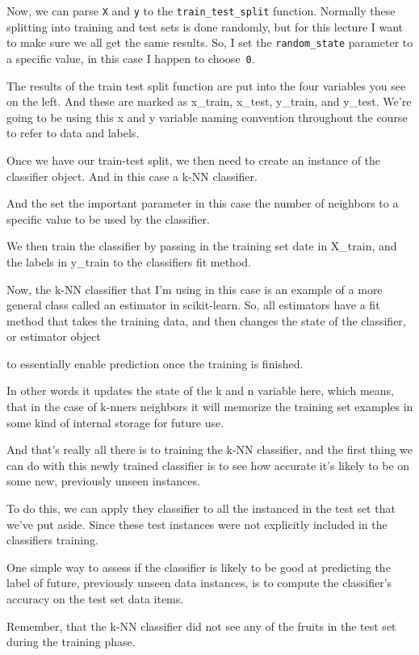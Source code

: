\begin{multicols}{2}
Now, we can parse \texttt{X} and \texttt{y} to the \texttt{train_test_split} function. Normally these splitting into training and test sets is done randomly, but for this lecture I want to make sure we all get the same results. So, I set the \texttt{random_state} parameter to a specific value, in this case I happen to choose~\texttt{0}. 

The results of the train test split function are put into the four variables you see on the left. And these are marked as x_train, x_test, y_train, and y_test. We're going to be using this x and y variable naming convention throughout the course to refer to data and labels. 

Once we have our train-test split, we then need to create an instance of the classifier object. And in this case a k-NN classifier. 

And the set the important parameter in this case the number of neighbors to a specific value to be used by the classifier. 

We then train the classifier by passing in the training set date in X_train, and the labels in y_train to the classifiers fit method. 

Now, the k-NN classifier that I'm using in this case is an example of a more general class called an estimator in scikit-learn. So, all estimators have a fit method that takes the training data, and then changes the state of the classifier, or estimator object 

to essentially enable prediction once the training is finished. 

In other words it updates the state of the k and n variable here, which means, that in the case of k-nners neighbors it will memorize the training set examples in some kind of internal storage for future use. 

And that's really all there is to training the k-NN classifier, and the first thing we can do with this newly trained classifier is to see how accurate it's likely to be on some new, previously unseen instances. 

To do this, we can apply they classifier to all the instanced in the test set that we've put aside. Since these test instances were not explicitly included in the classifiers training. 

One simple way to assess if the classifier is likely to be good at predicting the label of future, previously unseen data instances, is to compute the classifier's accuracy on the test set data items. 

Remember, that the k-NN classifier did not see any of the fruits in the test set during the training phase. 


\end{multicols}

